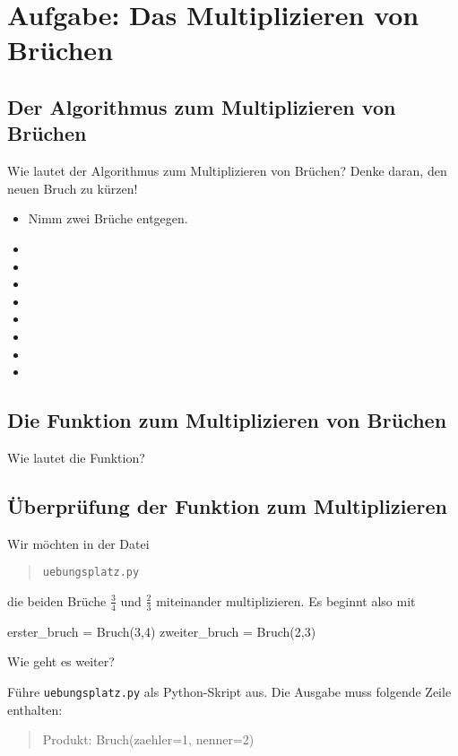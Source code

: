 \section{Aufgabe: Das Multiplizieren von Brüchen}

\subsection*{Der Algorithmus zum Multiplizieren von Brüchen}

Wie lautet der Algorithmus zum Multiplizieren von Brüchen? Denke daran, den neuen Bruch zu kürzen!

\begin{itemize}[itemsep=5ex]
	\item Nimm zwei Brüche entgegen.
	\item 
	\item 
	\item 
	\item 
	\item 
	\item  
	\item 
	\item 
\end{itemize}

\pagebreak

\subsection*{Die Funktion zum Multiplizieren von Brüchen}

Wie lautet die Funktion?

\subsection*{Überprüfung der Funktion zum Multiplizieren}

Wir möchten in der Datei
\begin{quote}
	\texttt{uebungsplatz.py}
\end{quote}
die beiden Brüche $\frac{3}{4}$ und $\frac{2}{3}$ miteinander multiplizieren. Es beginnt also mit

\begin{codePython}
erster_bruch = Bruch(3,4)
zweiter_bruch = Bruch(2,3)
\end{codePython}

Wie geht es weiter?

Führe \texttt{uebungsplatz.py} als Python-Skript aus. Die Ausgabe muss folgende Zeile enthalten:
\begin{quote}
	Produkt: Bruch(zaehler=1, nenner=2)
\end{quote}